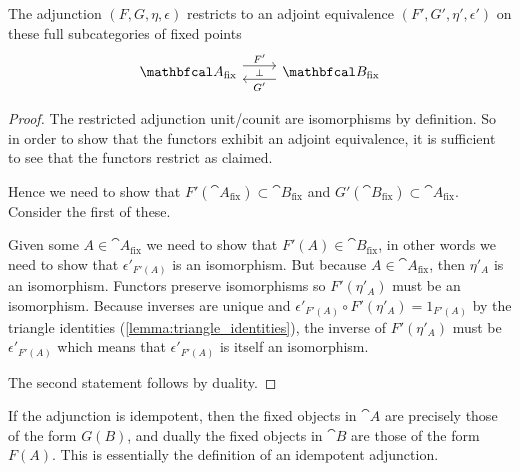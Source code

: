 \documentclass[11pt,a4paper]{article}
\begin{document}
\begin{proposition}
    The adjunction $(F,G,\eta,\epsilon)$ restricts to an adjoint equivalence $(F',G',\eta',\epsilon')$ on these full subcategories of fixed points
    \begin{equation*}
    \begin{tikzcd}
        \cat{A}_{\text{fix}} \arrow[r, shift left=2, "F'"] &
        \cat{B}_{\text{fix}} \arrow[l, shift left=2, "G'", "\bot"']
    \end{tikzcd}
    \end{equation*}
\end{proposition}
\begin{proof}
    The restricted adjunction unit/counit are isomorphisms by definition. So in order to show that the functors exhibit an adjoint equivalence, it is sufficient to see that the functors restrict as claimed.\par
    Hence we need to show that $F'(\cat{A}_{\text{fix}}) \subset  \cat{B}_{\text{fix}}$ and $G'(\cat{B}_{\text{fix}}) \subset \cat{A}_{\text{fix}}$. Consider the first of these.\par
    Given some $A\in\cat{A}_{\text{fix}}$ we need to show that $F'(A)\in\cat{B}_{\text{fix}}$, in other words we need to show that $\epsilon'_{F'(A)}$ is an isomorphism. But because $A\in\cat{A}_{\text{fix}}$, then $\eta'_A$ is an isomorphism. Functors preserve isomorphisms so $F'(\eta'_A)$ must be an isomorphism. Because inverses are unique and $\epsilon'_{F'(A)} \circ F'(\eta'_A) = 1_{F'(A)}$ by the triangle identities (\ref{lemma:triangle_identities}), the inverse of $F'(\eta'_A)$ must be $\epsilon'_{F'(A)}$ which means that $\epsilon'_{F'(A)}$ is itself an isomorphism.\par
    The second statement follows by duality.
\end{proof}

    If the adjunction is idempotent, then the fixed objects in $\cat{A}$ are precisely those of the form $G(B)$, and dually the fixed objects in $\cat{B}$ are those of the form $F(A)$. This is essentially the definition of an idempotent adjunction.
\end{document}
